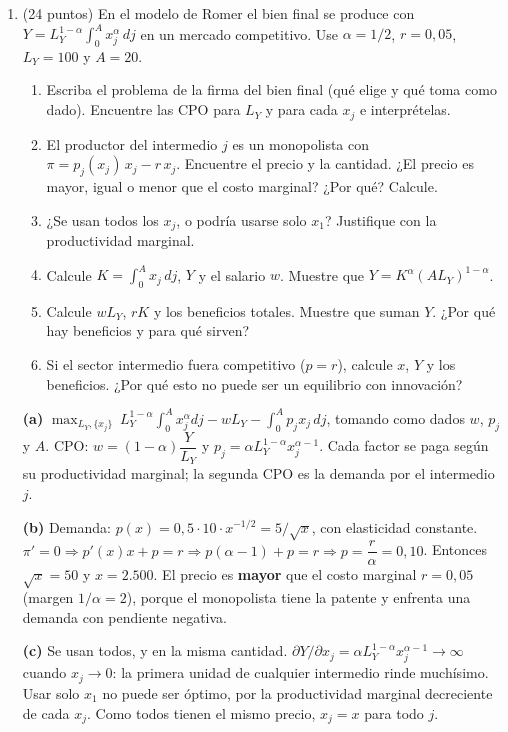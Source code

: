 \documentclass[12pt,letterpaper]{article}
\begin{document}
\begin{enumerate}[label=\arabic*.,leftmargin=1.6em,itemsep=0.8em]
\item (24 puntos) En el modelo de Romer el bien final se produce con $Y=L_Y^{1-\alpha}\int_0^A x_j^{\alpha}\,dj$ en un mercado competitivo. Use $\alpha=1/2$, $r=0{,}05$, $L_Y=100$ y $A=20$.
\begin{enumerate}[label=(\alph*)]
\item Escriba el problema de la firma del bien final (qué elige y qué toma como dado). Encuentre las CPO para $L_Y$ y para cada $x_j$ e interprételas.
\item El productor del intermedio $j$ es un monopolista con $\pi=p_j(x_j)\,x_j-r\,x_j$. Encuentre el precio y la cantidad. ¿El precio es mayor, igual o menor que el costo marginal? ¿Por qué? Calcule.
\item ¿Se usan todos los $x_j$, o podría usarse solo $x_1$? Justifique con la productividad marginal.
\item Calcule $K=\int_0^A x_j\,dj$, $Y$ y el salario $w$. Muestre que $Y=K^{\alpha}(AL_Y)^{1-\alpha}$.
\item Calcule $wL_Y$, $rK$ y los beneficios totales. Muestre que suman $Y$. ¿Por qué hay beneficios y para qué sirven?
\item Si el sector intermedio fuera competitivo ($p=r$), calcule $x$, $Y$ y los beneficios. ¿Por qué esto no puede ser un equilibrio con innovación?
\end{enumerate}
\begin{resp}
\textbf{(a)} $\max_{L_Y,\{x_j\}}\ L_Y^{1-\alpha}\int_0^A x_j^{\alpha}dj-wL_Y-\int_0^A p_jx_j\,dj$, tomando como dados $w$, $p_j$ y $A$. CPO: $w=(1-\alpha)\dfrac{Y}{L_Y}$ y $p_j=\alpha L_Y^{1-\alpha}x_j^{\alpha-1}$. Cada factor se paga según su productividad marginal; la segunda CPO es la demanda por el intermedio $j$.

\textbf{(b)} Demanda: $p(x)=0{,}5\cdot10\cdot x^{-1/2}=5/\sqrt x$, con elasticidad constante. $\pi'=0\Rightarrow p'(x)x+p=r\Rightarrow p(\alpha-1)+p=r\Rightarrow p=\dfrac{r}{\alpha}=0{,}10$. Entonces $\sqrt x=50$ y $x=2.500$. El precio es \textbf{mayor} que el costo marginal $r=0{,}05$ (margen $1/\alpha=2$), porque el monopolista tiene la patente y enfrenta una demanda con pendiente negativa.

\textbf{(c)} Se usan todos, y en la misma cantidad. $\partial Y/\partial x_j=\alpha L_Y^{1-\alpha}x_j^{\alpha-1}\to\infty$ cuando $x_j\to0$: la primera unidad de cualquier intermedio rinde muchísimo. Usar solo $x_1$ no puede ser óptimo, por la productividad marginal decreciente de cada $x_j$. Como todos tienen el mismo precio, $x_j=x$ para todo $j$.


\end{resp}
\end{enumerate}
\end{document}

